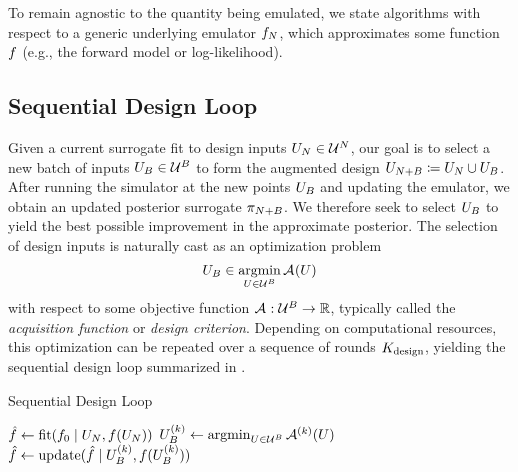 \documentclass[12pt]{article}
\begin{document}
To remain agnostic to the quantity being emulated, we state algorithms with respect to
a generic underlying emulator $\funcEm[\Ndesign]$, which approximates some function
$\func$ (e.g., the forward model or log-likelihood).

\subsection{Sequential Design Loop}
Given a current surrogate fit to design inputs $\designIn[\Ndesign] \in \parSpace^{\Ndesign}$,
our goal is to select a new batch of inputs $\designBatchIn \in \parSpace^{\Nbatch}$
to form the augmented design $\designIn[\Naugment] \Def \designIn[\Ndesign] \cup \designBatchIn$.
After running the simulator at the new points $\designBatchIn$ and updating the emulator, we obtain
an updated posterior surrogate $\postEm[\Naugment]$. We therefore seek to select $\designBatchIn$
to yield the best possible improvement in the approximate posterior. The selection of design inputs is naturally
cast as an optimization problem 
\begin{equation}
\designBatchIn \in \argmin_{\parMat \in \parSpace^{\Nbatch}} \acq[](\parMat)
\label{eq:acq-opt}
\end{equation}
with respect to some objective function $\acq[]: \parSpace^{\Nbatch} \to \R$, typically
called the \textit{acquisition function} or \textit{design criterion}.
Depending on computational resources, this optimization can be repeated over a sequence of 
rounds $\Nrounds$, yielding the sequential design loop summarized in .
\begin{algorithm}
    \caption{Sequential Design Loop}
    \label{alg:seq-des-loop}
    \begin{algorithmic}[1] %
    	\State $\hat{\func} \gets \mathrm{fit}(\funcPrior \given \designIn[\Ndesign], \func(\designIn[\Ndesign]))$
         
        		\State $\designBatchIn^{(\designIndex)} \gets \argmin_{\parMat \in \parSpace^{\Nbatch}} \acq[]^{(\designIndex)}(\parMat)$ 
		\State $\hat{f} \gets \mathrm{update}(\hat{f} \given \designBatchIn^{(\designIndex)}, \func(\designBatchIn^{(\designIndex)}))$
	\EndFor
	\EndFunction
    \end{algorithmic}
\end{algorithm}
\end{document}
